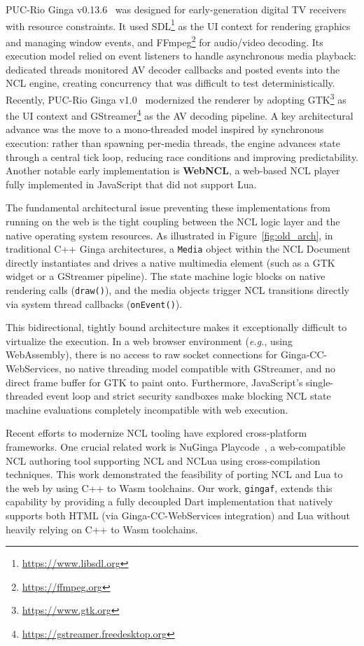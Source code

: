 \documentclass[sigconf]{webmedia}
\newcommand{\projectname}{\texttt{gingaf}}
\begin{document}
PUC-Rio Ginga v0.13.6~\cite{ginga2013,moreno2010conciliando} was designed for early-generation digital TV receivers with resource constraints. It used SDL\footnote{\url{https://www.libsdl.org}} as the UI context for rendering graphics and managing window events, and FFmpeg\footnote{\url{https://ffmpeg.org}} for audio/video decoding. Its execution model relied on event listeners to handle asynchronous media playback: dedicated threads monitored AV decoder callbacks and posted events into the NCL engine, creating concurrency that was difficult to test deterministically. Recently, PUC-Rio Ginga v1.0~\cite{ginga2018,dodsworth2018dynamic} modernized the renderer by adopting GTK\footnote{\url{https://www.gtk.org}} as the UI context and GStreamer\footnote{\url{https://gstreamer.freedesktop.org}} as the AV decoding pipeline. A key architectural advance was the move to a mono-threaded model inspired by synchronous execution: rather than spawning per-media threads, the engine advances state through a central tick loop, reducing race conditions and improving predictability. Another notable early implementation is \textbf{WebNCL}, a web-based NCL player fully implemented in JavaScript that did not support Lua.

The fundamental architectural issue preventing these implementations from running on the web is the tight coupling between the NCL logic layer and the native operating system resources. As illustrated in Figure~\ref{fig:old_arch}, in traditional C++ Ginga architectures, a \texttt{Media} object within the NCL Document directly instantiates and drives a native multimedia element (such as a GTK widget or a GStreamer pipeline). The state machine logic blocks on native rendering calls (\texttt{draw()}), and the media objects trigger NCL transitions directly via system thread callbacks (\texttt{onEvent()}). 

This bidirectional, tightly bound architecture makes it exceptionally difficult to virtualize the execution. In a web browser environment (\textit{e.g.}, using WebAssembly), there is no access to raw socket connections for Ginga-CC-WebServices, no native threading model compatible with GStreamer, and no direct frame buffer for GTK to paint onto. Furthermore, JavaScript's single-threaded event loop and strict security sandboxes make blocking NCL state machine evaluations completely incompatible with web execution.

Recent efforts to modernize NCL tooling have explored cross-platform frameworks. One crucial related work is NuGinga Playcode~\cite{nuginga_playcode20}, a web-compatible NCL authoring tool supporting NCL and NCLua using cross-compilation techniques. This work demonstrated the feasibility of porting NCL and Lua to the web by using C++ to Wasm toolchains. Our work, \projectname{}, extends this capability by providing a fully decoupled Dart implementation that natively supports both HTML (via Ginga-CC-WebServices integration) and Lua without heavily relying on C++ to Wasm toolchains.
\end{document}
